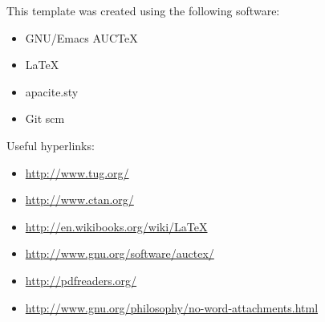 \documentclass[12pt,a4paper]{article}
\begin{document}
\newpage
This template was created using the following software:
\begin{itemize}
\item GNU/Emacs AUCTeX
\item \LaTeX
\item apacite.sty
\item Git scm
\end{itemize}
\vfill
Useful hyperlinks:
\begin{itemize}
\item \url{http://www.tug.org/}
\item \url{http://www.ctan.org/}
\item \url{http://en.wikibooks.org/wiki/LaTeX}
\item \url{http://www.gnu.org/software/auctex/}
\item \url{http://pdfreaders.org/}
\item \url{http://www.gnu.org/philosophy/no-word-attachments.html}
\end{itemize}
\end{document}

